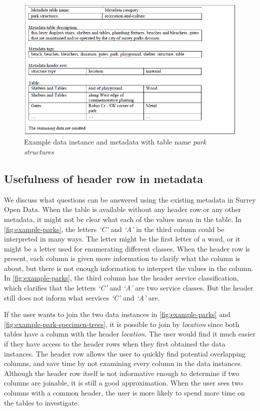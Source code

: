 \begin{figure}
    \centering
    \includegraphics[width=5in]{figures/example-park-structures.png}
    \caption{Example data instance and metadata with table name \textit{park structures}}
    \label{fig:example-park-structures}
\end{figure}

\subsection{Usefulness of header row in metadata}

We discuss what questions can be answered using the existing metadata in Surrey Open Data. When the table is available without any header row or any other metadata, it might not be clear what each of the values mean in the table. In \autoref{fig:example-parks}, the letters \textit{`C'} and \textit{`A'} in the third column could be interpreted in many ways. The letter might be the first letter of a word, or it might be a letter used for enumerating different classes. When the header row is present, each column is given more information to clarify what the column is about, but there is not enough information to interpret the values in the column. In \autoref{fig:example-parks}, the third column has the header service classification, which clarifies that the letters \textit{`C'} and \textit{`A'} are two service classes. But the header still does not inform what services \textit{`C'} and \textit{`A'} are.

If the user wants to join the two data instances in \autoref{fig:example-parks} and \autoref{fig:example-park-specimen-trees}, it is possible to join by \textit{location} since both tables have a column with the header \textit{location}. The user would find it much easier if they have access to the header rows when they first obtained the data instances. The header row allows the user to quickly find potential overlapping columns, and save time by not examining every column in the data instances. Although the header row itself is not informative enough to determine if two columns are joinable, it is still a good approximation. When the user sees two columns with a common header, the user is more likely to spend more time on the tables to investigate.

